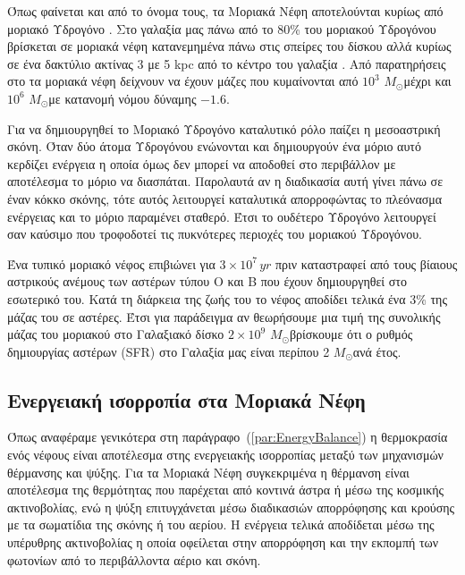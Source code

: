 \documentclass[a4paper,12pt]{memoir}
\newcommand{\sm}{$M_{\odot}$}
\begin{document}
Όπως φαίνεται και από το όνομα τους, τα Μοριακά Νέφη αποτελούνται κυρίως από μοριακό Υδρογόνο . Στο γαλαξία μας πάνω από το 80\% του μοριακού Υδρογόνου βρίσκεται σε μοριακά νέφη κατανεμημένα πάνω στις σπείρες του δίσκου αλλά κυρίως σε ένα δακτύλιο ακτίνας 3 με 5 kpc από το κέντρο του γαλαξία \cite{rathborne_2009}.  Από παρατηρήσεις στο  τα μοριακά νέφη δείχνουν να έχουν μάζες που κυμαίνονται από $10^3$ \sm μέχρι και $10^6$ \sm με κατανομή νόμου δύναμης $-1.6$. \cite{stahlern_2004}

Για να δημιουργηθεί το Μοριακό Υδρογόνο καταλυτικό ρόλο παίζει η μεσοαστρική σκόνη.  Όταν δύο άτομα Υδρογόνου ενώνονται και δημιουργούν ένα μόριο  αυτό κερδίζει ενέργεια η οποία όμως δεν μπορεί να αποδοθεί στο περιβάλλον με αποτέλεσμα το μόριο να διασπάται. Παρολαυτά αν η διαδικασία αυτή γίνει πάνω σε έναν κόκκο σκόνης, τότε αυτός λειτουργεί καταλυτικά απορροφώντας το πλεόνασμα ενέργειας και το μόριο παραμένει σταθερό. Έτσι το ουδέτερο Υδρογόνο λειτουργεί σαν καύσιμο που τροφοδοτεί τις πυκνότερες περιοχές του μοριακού Υδρογόνου.

Ένα τυπικό μοριακό νέφος επιβιώνει για $3\times 10^7 \, yr$ πριν καταστραφεί από τους βίαιους αστρικούς ανέμους των αστέρων τύπου O και B που έχουν δημιουργηθεί στο εσωτερικό του. Κατά τη διάρκεια της ζωής του το νέφος αποδίδει τελικά ένα 3\% της μάζας του σε αστέρες. Έτσι για παράδειγμα αν θεωρήσουμε μια τιμή της συνολικής μάζας του μοριακού  στο Γαλαξιακό δίσκο $2\times 10^9$ \sm βρίσκουμε ότι ο ρυθμός δημιουργίας αστέρων (SFR) στο Γαλαξία μας είναι περίπου 2 \sm ανά έτος.  

\subsection{Ενεργειακή ισορροπία στα Μοριακά Νέφη}
Όπως αναφέραμε γενικότερα στη παράγραφο~(\ref{par:EnergyBalance}) η θερμοκρασία ενός νέφους είναι αποτέλεσμα στης ενεργειακής ισορροπίας μεταξύ των μηχανισμών θέρμανσης και ψύξης. Για τα Μοριακά Νέφη συγκεκριμένα η θέρμανση είναι αποτέλεσμα της θερμότητας που παρέχεται από κοντινά άστρα ή μέσω της κοσμικής ακτινοβολίας, ενώ η ψύξη επιτυγχάνεται μέσω διαδικασιών απορρόφησης και κρούσης με τα σωματίδια της σκόνης ή του αερίου.
Η ενέργεια τελικά αποδίδεται μέσω της υπέρυθρης ακτινοβολίας η οποία οφείλεται στην απορρόφηση και την εκπομπή των φωτονίων από το περιβάλλοντα αέριο και σκόνη.
\end{document}
